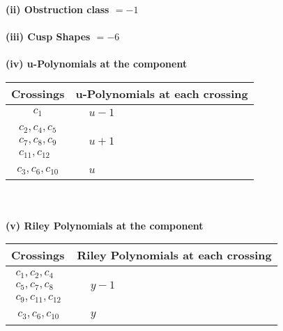 \documentclass[1p]{elsarticle_modified}
\theoremstyle{definition}
\begin{document}
\flushleft \textbf{(ii) Obstruction class $= -1$}\\~\\
\flushleft \textbf{(iii) Cusp Shapes $= -6$}\\~\\
\newpage\renewcommand{\arraystretch}{1}
\flushleft \textbf{(iv) u-Polynomials at the component}\newline \\
\begin{tabular}{m{50pt}|m{274pt}}
Crossings & \hspace{64pt}u-Polynomials at each crossing \\
\hline $$\begin{aligned}c_{1}\end{aligned}$$&$\begin{aligned}
&u-1
\end{aligned}$\\
\hline $$\begin{aligned}c_{2},c_{4},c_{5}\\c_{7},c_{8},c_{9}\\c_{11},c_{12}\end{aligned}$$&$\begin{aligned}
&u+1
\end{aligned}$\\
\hline $$\begin{aligned}c_{3},c_{6},c_{10}\end{aligned}$$&$\begin{aligned}
&u
\end{aligned}$\\
\hline
\end{tabular}\\~\\
\newpage\renewcommand{\arraystretch}{1}
\flushleft \textbf{(v) Riley Polynomials at the component}\newline \\
\begin{tabular}{m{50pt}|m{274pt}}
Crossings & \hspace{64pt}Riley Polynomials at each crossing \\
\hline $$\begin{aligned}c_{1},c_{2},c_{4}\\c_{5},c_{7},c_{8}\\c_{9},c_{11},c_{12}\end{aligned}$$&$\begin{aligned}
&y-1
\end{aligned}$\\
\hline $$\begin{aligned}c_{3},c_{6},c_{10}\end{aligned}$$&$\begin{aligned}
&y
\end{aligned}$\\
\hline
\end{tabular}\\~\\
\end{document}
